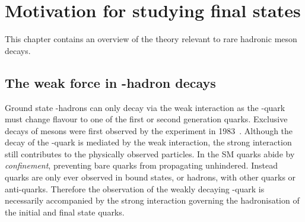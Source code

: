 \chapter{Motivation for studying \decay{\Bp}{\Dsp\Kp\Km} final states} 
\label{ch:theory}

\minitoc


This chapter contains an overview of the theory relevant to rare hadronic \B meson decays.





\section{The weak force in \bquark-hadron decays}

Ground state \bquark-hadrons can only decay via the weak interaction as the \bquark-quark must change flavour to one of the first or second generation quarks.
Exclusive decays of \B mesons were first observed by the \cleo experiment in 1983~\cite{PhysRevLett.50.881}. 
Although the decay of the \bquark-quark is mediated by the weak interaction, the strong interaction still contributes to the physically observed particles.  
In the SM quarks abide by \emph{confinement}, preventing bare quarks from propagating unhindered. Instead quarks are only ever observed in bound states, or hadrons, with other quarks or anti-quarks. Therefore the observation of the weakly decaying \bquark-quark is necessarily accompanied by the strong interaction governing the hadronisation of the initial and final state quarks.


